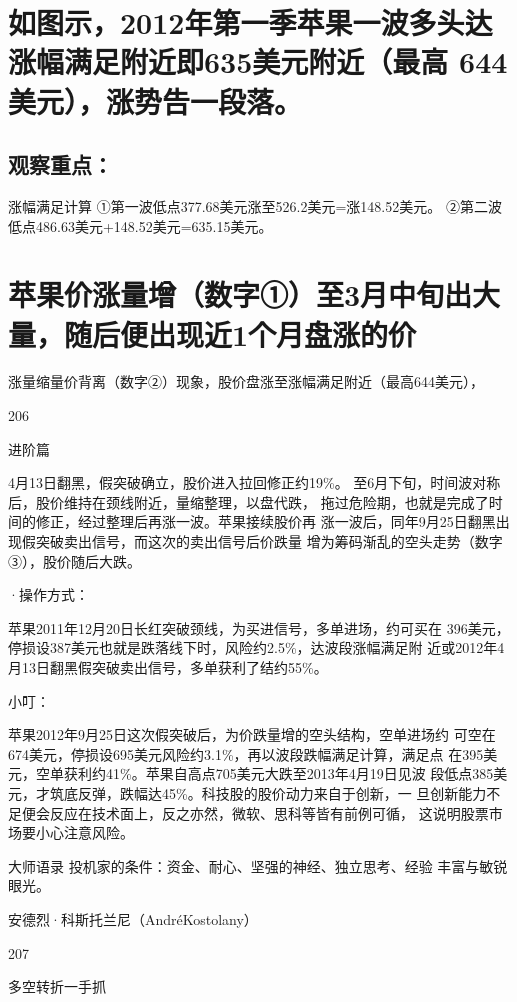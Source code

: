 \documentclass{article}
\begin{document}
\section{如图示，2012年第一季苹果一波多头达涨幅满足附近即635美元附近（最高 644美元），涨势告一段落。}

\subsection{观察重点：}

涨幅满足计算 ①第一波低点377.68美元涨至526.2美元=涨148.52美元。 ②第二波低点486.63美元+148.52美元=635.15美元。

\section{苹果价涨量增（数字①）至3月中旬出大量，随后便出现近1个月盘涨的价}

涨量缩量价背离（数字②）现象，股价盘涨至涨幅满足附近（最高644美元），

206

\clearpage

进阶篇

4月13日翻黑，假突破确立，股价进入拉回修正约19\%。 至6月下旬，时间波对称后，股价维持在颈线附近，量缩整理，以盘代跌， 拖过危险期，也就是完成了时间的修正，经过整理后再涨一波。苹果接续股价再 涨一波后，同年9月25日翻黑出现假突破卖出信号，而这次的卖出信号后价跌量 增为筹码渐乱的空头走势（数字③），股价随后大跌。

·操作方式：

苹果2011年12月20日长红突破颈线，为买进信号，多单进场，约可买在 396美元，停损设387美元也就是跌落线下时，风险约2.5\%，达波段涨幅满足附 近或2012年4月13日翻黑假突破卖出信号，多单获利了结约55\%。

小叮：

苹果2012年9月25日这次假突破后，为价跌量增的空头结构，空单进场约 可空在674美元，停损设695美元风险约3.1\%，再以波段跌幅满足计算，满足点 在395美元，空单获利约41\%。苹果自高点705美元大跌至2013年4月19日见波 段低点385美元，才筑底反弹，跌幅达45\%。科技股的股价动力来自于创新，一 旦创新能力不足便会反应在技术面上，反之亦然，微软、思科等皆有前例可循， 这说明股票市场要小心注意风险。

大师语录 投机家的条件：资金、耐心、坚强的神经、独立思考、经验 丰富与敏锐眼光。

安德烈·科斯托兰尼（AndréKostolany）

207

\clearpage

多空转折一手抓
\end{document}
